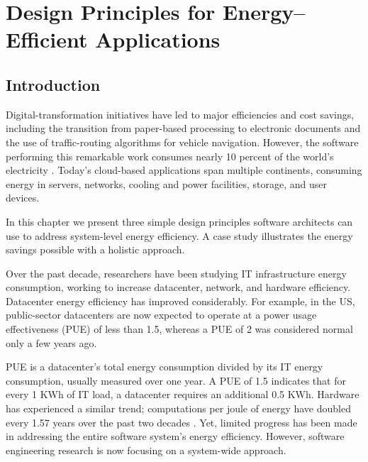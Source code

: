 \chapter{Design Principles for Energy--Efficient Applications}


\section{Introduction}

Digital-transformation initiatives have led to major efficiencies and cost savings, including the transition from paper-based processing to electronic documents and the use of traffic-routing algorithms for vehicle navigation. However, the software performing this remarkable work consumes nearly 10 percent of the world's electricity \cite{mills2013-digital-energyusage}. Today's cloud-based applications span multiple continents, consuming energy in servers, networks, cooling and power facilities, storage, and user devices.

In this chapter we present three simple design principles software architects can use to address system-level energy efficiency. A case study illustrates the energy savings possible with a holistic approach.

Over the past decade, researchers have been studying IT infrastructure energy consumption, working to increase datacenter, network, and hardware efficiency. Datacenter energy efficiency has improved considerably. For example, in the US, public-sector datacenters are now expected to operate at a power usage effectiveness (PUE) of less than 1.5, whereas a PUE of 2 was considered normal only a few years ago.

PUE is a datacenter's total energy consumption divided by its IT energy consumption, usually measured over one year. A PUE of 1.5 indicates that for every 1 KWh of IT load, a datacenter requires an additional 0.5 KWh.
Hardware has experienced a similar trend; computations per joule of energy have doubled every 1.57 years over the past two decades \cite{koomey2011-trends-energy-efficiency}. Yet, limited progress has been made in addressing the entire software system's energy efficiency. However, software engineering research is now focusing on a system-wide approach.

